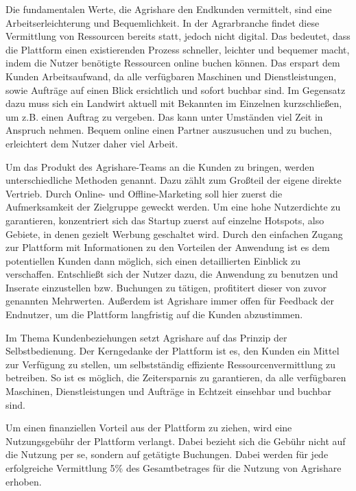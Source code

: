 Die fundamentalen Werte, die Agrishare den Endkunden vermittelt, sind eine Arbeitserleichterung und Bequemlichkeit. In der Agrarbranche findet diese Vermittlung von Ressourcen bereits statt, jedoch nicht digital. Das bedeutet, dass die Plattform einen existierenden Prozess schneller, leichter und bequemer macht, indem die Nutzer benötigte Ressourcen online buchen können. Das erspart dem Kunden Arbeitsaufwand, da alle verfügbaren Maschinen und Dienstleistungen, sowie Aufträge auf einen Blick ersichtlich und sofort buchbar sind. Im Gegensatz dazu muss sich ein Landwirt aktuell mit Bekannten im Einzelnen kurzschließen, um z.B. einen Auftrag zu vergeben. Das kann unter Umständen viel Zeit in Anspruch nehmen. Bequem online einen Partner auszusuchen und zu buchen, erleichtert dem Nutzer daher viel Arbeit.

Um das Produkt des Agrishare-Teams an die Kunden zu bringen, werden unterschiedliche Methoden genannt. Dazu zählt zum Großteil der eigene direkte Vertrieb. Durch Online- und Offline-Marketing soll hier zuerst die Aufmerksamkeit der Zielgruppe geweckt werden. Um eine hohe Nutzerdichte zu garantieren, konzentriert sich das Startup zuerst auf einzelne Hotspots, also Gebiete, in denen gezielt Werbung geschaltet wird. Durch den einfachen Zugang zur Plattform mit Informationen zu den Vorteilen der Anwendung ist es dem potentiellen Kunden dann möglich, sich einen detaillierten Einblick zu verschaffen. Entschließt sich der Nutzer dazu, die Anwendung zu benutzen und Inserate einzustellen bzw. Buchungen zu tätigen, profititert dieser von zuvor genannten Mehrwerten. Außerdem ist Agrishare immer offen für Feedback der Endnutzer, um die Plattform langfristig auf die Kunden abzustimmen.

Im Thema Kundenbeziehungen setzt Agrishare auf das Prinzip der Selbstbedienung. Der Kerngedanke der Plattform ist es, den Kunden ein Mittel zur Verfügung zu stellen, um selbstständig effiziente Ressourcenvermittlung zu betreiben. So ist es möglich, die Zeitersparnis zu garantieren, da alle verfügbaren Maschinen, Dienstleistungen und Aufträge in Echtzeit einsehbar und buchbar sind. 

Um einen finanziellen Vorteil aus der Plattform zu ziehen, wird eine Nutzungsgebühr der Plattform verlangt. Dabei bezieht sich die Gebühr nicht auf die Nutzung per se, sondern auf getätigte Buchungen. Dabei werden für jede erfolgreiche Vermittlung 5\% des Gesamtbetrages für die Nutzung von Agrishare erhoben.

